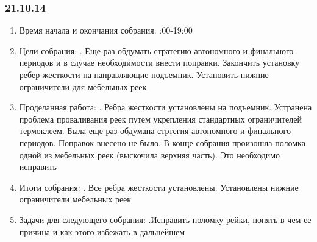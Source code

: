 \documentclass[11pt]{article}
\begin{document}
          \subsubsection{21.10.14}
          \begin{enumerate}
             \item Время начала и окончания собрания:
             :00-19:00
             \item Цели собрания:
             . Еще раз обдумать стратегию автономного и финального периодов и в случае необходимости внести поправки. Закончить установку ребер жесткости на направляющие подъемник. Установить нижние ограничители для мебельных реек\newline
             \item Проделанная работа:
             . Ребра жесткости установлены на подъемник. Устранена проблема проваливания реек путем укрепления стандартных ограничителей термоклеем. Была еще раз обдумана стртегия автономного и финального периодов. Поправок внесено не было. В конце собрания произошла поломка одной из мебельных реек (выскочила верхняя часть). Это необходимо исправить
             \item Итоги собрания:
             . Все ребра жесткости установлены. Установлены нижние ограничители мебельных реек
             \item Задачи для следующего собрания:
             .Исправить поломку рейки, понять в чем ее причина и как этого избежать в дальнейшем
          \end{enumerate} 
          \newpage
\end{document}
